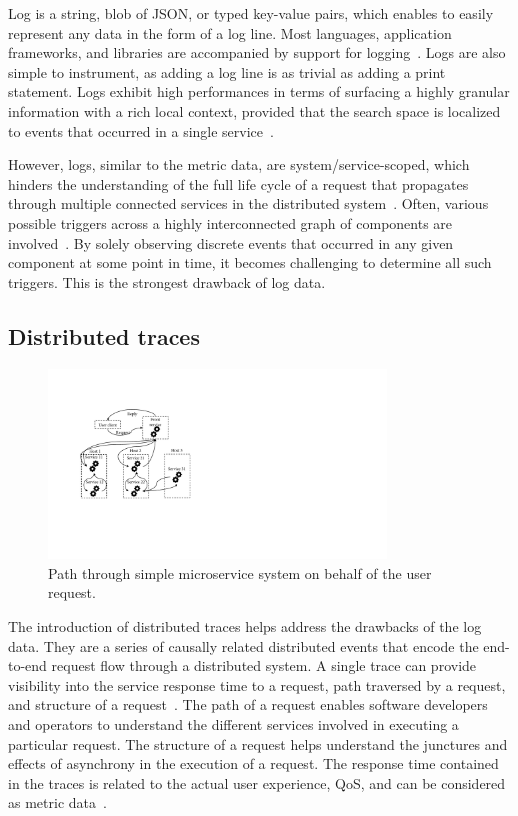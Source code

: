 Log is a string, blob of JSON, or typed key-value pairs, which enables to easily represent any data in the form of a log line. Most languages, application frameworks, and libraries are accompanied by support for logging~\cite{liu2019logzip}. Logs are also simple to instrument, as adding a log line is as trivial as adding a print statement. Logs exhibit high performances in terms of surfacing a highly granular information with a rich local context, provided that the search space is localized to events that occurred in a single service~\cite{sridharan2018distributed,hamooni2016logmine}.

However, logs, similar to the metric data, are system/service-scoped, which hinders the understanding of the full life cycle of a request that propagates through multiple connected services in the distributed system~\cite{sridharan2018distributed}. 
Often, various possible triggers across a highly interconnected graph of components are involved~\cite{gunawi2014bugs,sillito2020failures}. By solely observing discrete events that occurred in any given component at some point in time, it becomes challenging to determine all such triggers. This is the strongest drawback of log data.


\subsection{Distributed traces} \label{ch:background:sec:observability:subsec:traces}

\begin{figure}[!t]
\centerline{\includegraphics[width=0.8\textwidth]{gfx/chap2/pathmicroservice.pdf}}
\caption{Path through simple microservice system on behalf of the user request.}
\label{fig:pathmicroservice}
\end{figure}

The introduction of distributed traces helps address the drawbacks of the log data. They are a series of causally related distributed events that encode the end-to-end request flow through a distributed system. A single trace can provide visibility into the service response time to a request, path traversed by a request, and structure of a request~\cite{sigelman2010dapper,RepTrace}. The path of a request enables software developers and operators to understand the different services involved in executing a particular request. The structure of a request helps understand the junctures and effects of asynchrony in the execution of a request. The response time contained in the traces is related to the actual user experience, QoS, and can be considered as metric data~\cite{nedelkoski2019anomaly,nedelkoski2019anomalymultimodal}. 



